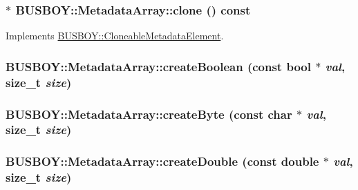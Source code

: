 \label{classBUSBOY_1_1MetadataArray_a6887226ffdbb385933776c98e80f53f6}
\hypertarget{classBUSBOY_1_1MetadataArray_ad7a804d6e13ada7283e23b9e91e3b699}{
\subsubsection[{clone}]{ $\ast$ BUSBOY::MetadataArray::clone () const}}
\label{classBUSBOY_1_1MetadataArray_ad7a804d6e13ada7283e23b9e91e3b699}


Implements \hyperlink{classBUSBOY_1_1CloneableMetadataElement_af09790fd6aa07e67fc8c2a0a8cb09291}{BUSBOY::CloneableMetadataElement}.\hypertarget{classBUSBOY_1_1MetadataArray_af8a7f889077a71340a0c270aa0a8ca09}{
\subsubsection[{createBoolean}]{ BUSBOY::MetadataArray::createBoolean (const bool $\ast$ {\em val}, \/  size\_\-t {\em size})}}
\label{classBUSBOY_1_1MetadataArray_af8a7f889077a71340a0c270aa0a8ca09}
\hypertarget{classBUSBOY_1_1MetadataArray_a74ecc4d8b773e91bf2c869131d981448}{
\subsubsection[{createByte}]{ BUSBOY::MetadataArray::createByte (const char $\ast$ {\em val}, \/  size\_\-t {\em size})}}
\label{classBUSBOY_1_1MetadataArray_a74ecc4d8b773e91bf2c869131d981448}
\hypertarget{classBUSBOY_1_1MetadataArray_a4703f8e6898cd711ddec3b0c2a18abfc}{
\subsubsection[{createDouble}]{ BUSBOY::MetadataArray::createDouble (const double $\ast$ {\em val}, \/  size\_\-t {\em size})}}
